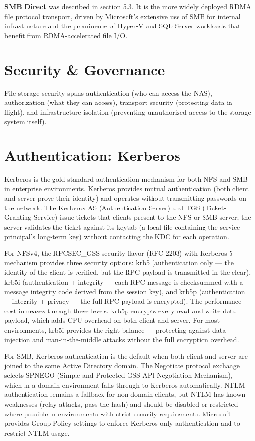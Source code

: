 \textbf{SMB Direct} was described in section 5.3. It is the more widely deployed RDMA file protocol transport, driven by Microsoft's extensive use of SMB for internal infrastructure and the prominence of Hyper-V and SQL Server workloads that benefit from RDMA-accelerated file I/O.

\section{Security \& Governance}
File storage security spans authentication (who can access the NAS), authorization (what they can access), transport security (protecting data in flight), and infrastructure isolation (preventing unauthorized access to the storage system itself).

\section{Authentication: Kerberos}
Kerberos is the gold-standard authentication mechanism for both NFS and SMB in enterprise environments. Kerberos provides mutual authentication (both client and server prove their identity) and operates without transmitting passwords on the network. The Kerberos AS (Authentication Server) and TGS (Ticket-Granting Service) issue tickets that clients present to the NFS or SMB server; the server validates the ticket against its keytab (a local file containing the service principal's long-term key) without contacting the KDC for each operation.

For NFSv4, the RPCSEC\_GSS security flavor (RFC 2203) with Kerberos 5 mechanism provides three security options: krb5 (authentication only --- the identity of the client is verified, but the RPC payload is transmitted in the clear), krb5i (authentication + integrity --- each RPC message is checksummed with a message integrity code derived from the session key), and krb5p (authentication + integrity + privacy --- the full RPC payload is encrypted). The performance cost increases through these levels: krb5p encrypts every read and write data payload, which adds CPU overhead on both client and server. For most environments, krb5i provides the right balance --- protecting against data injection and man-in-the-middle attacks without the full encryption overhead.

For SMB, Kerberos authentication is the default when both client and server are joined to the same Active Directory domain. The Negotiate protocol exchange selects SPNEGO (Simple and Protected GSS-API Negotiation Mechanism), which in a domain environment falls through to Kerberos automatically. NTLM authentication remains a fallback for non-domain clients, but NTLM has known weaknesses (relay attacks, pass-the-hash) and should be disabled or restricted where possible in environments with strict security requirements. Microsoft provides Group Policy settings to enforce Kerberos-only authentication and to restrict NTLM usage.

